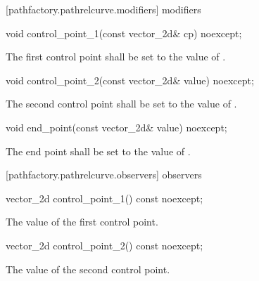  [pathfactory.pathrelcurve.modifiers]{ modifiers}

\begin{itemdecl}
    void control_point_1(const vector_2d& cp) noexcept;
\end{itemdecl}
\begin{itemdescr}
	\pnum
	\effects
	The first control point shall be set to the value of .
\end{itemdescr}

\begin{itemdecl}
    void control_point_2(const vector_2d& value) noexcept;
\end{itemdecl}
\begin{itemdescr}
	\pnum
	\effects
	The second control point shall be set to the value of .
\end{itemdescr}

\begin{itemdecl}
    void end_point(const vector_2d& value) noexcept;
\end{itemdecl}
\begin{itemdescr}
	\pnum
	\effects
	The end point shall be set to the value of .
\end{itemdescr}

 [pathfactory.pathrelcurve.observers]{ observers}

\begin{itemdecl}
    vector_2d control_point_1() const noexcept;
\end{itemdecl}
\begin{itemdescr}
	\pnum
	\returns
	The value of the first control point.
\end{itemdescr}

\begin{itemdecl}
    vector_2d control_point_2() const noexcept;
\end{itemdecl}
\begin{itemdescr}
	\pnum
	\returns
	The value of the second control point.
\end{itemdescr}

